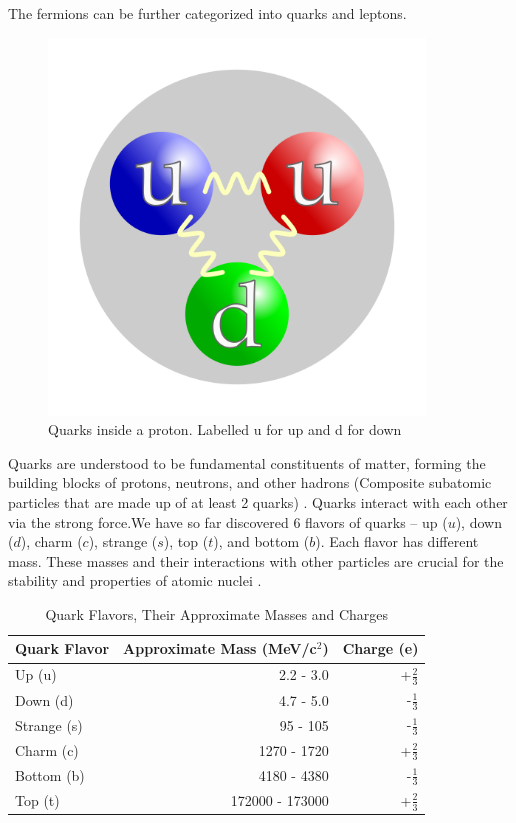 The fermions can be further categorized into quarks and leptons.

\begin{figure}[H]
  \centering
  \includegraphics[width=100mm]{figures/protonQuarks.png}
  \caption{Quarks inside a proton.
    Labelled u for up and d for down\cite{quark}}
  \label{protonQuarks}
\end{figure}

Quarks are understood to be fundamental constituents of matter, forming the building blocks of protons, neutrons, and other hadrons (Composite subatomic particles that are made up of at least 2 quarks) \cite{quark_Brit_2024}.
Quarks interact with each other via the strong force.We have so far discovered 6 flavors of quarks -- up (\(u\)), down (\(d\)), charm (\(c\)), strange (\(s\)), top (\(t\)), and bottom (\(b\)).
Each flavor has different mass.
These masses and their interactions with other particles are crucial for the stability and properties of atomic nuclei \cite{Nave_quark}.

\begin{table}[h!]

  \centering
  \begin{tabular}{lrr}
    \toprule
    Quark Flavor & Approximate Mass (MeV/c\(^2\)) & Charge (e) \\
    \midrule
    Up (u)      & 2.2 - 3.0        & +\(\frac{2}{3}\) \\
    Down (d)    & 4.7 - 5.0        & -\(\frac{1}{3}\) \\
    Strange (s) & 95 - 105         & -\(\frac{1}{3}\) \\
    Charm (c)   & 1270 - 1720      & +\(\frac{2}{3}\) \\
    Bottom (b)  & 4180 - 4380      & -\(\frac{1}{3}\) \\
    Top (t)     & 172000 - 173000  & +\(\frac{2}{3}\) \\
    \bottomrule
  \end{tabular}
  \caption{Quark Flavors, Their Approximate Masses and Charges \cite{Nave_quark}}
  \label{quarkMass}
\end{table}

